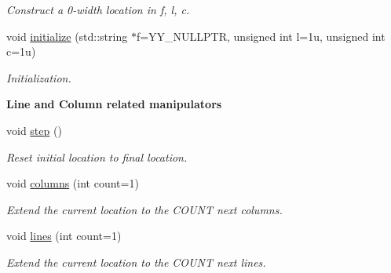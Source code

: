 \begin{DoxyCompactItemize}
\begin{DoxyCompactList}\small\item\em Construct a 0-\/width location in {\itshape f}, {\itshape l}, {\itshape c}. \end{DoxyCompactList}\item 
void \hyperlink{classEquationParser_1_1location_a5c7d7aa2ae28c40f506e83514acb3947}{initialize} (std\+::string $\ast$f=Y\+Y\+\_\+\+N\+U\+L\+L\+P\+TR, unsigned int l=1u, unsigned int c=1u)\hypertarget{classEquationParser_1_1location_a5c7d7aa2ae28c40f506e83514acb3947}{}\label{classEquationParser_1_1location_a5c7d7aa2ae28c40f506e83514acb3947}

\begin{DoxyCompactList}\small\item\em Initialization. \end{DoxyCompactList}\end{DoxyCompactItemize}
\begin{Indent}{\bf Line and Column related manipulators}\par
\begin{DoxyCompactItemize}
\item 
void \hyperlink{classEquationParser_1_1location_a8796256e64c782808b9e6cc5076f7b6b}{step} ()\hypertarget{classEquationParser_1_1location_a8796256e64c782808b9e6cc5076f7b6b}{}\label{classEquationParser_1_1location_a8796256e64c782808b9e6cc5076f7b6b}

\begin{DoxyCompactList}\small\item\em Reset initial location to final location. \end{DoxyCompactList}\item 
void \hyperlink{classEquationParser_1_1location_aef9d17fbbfb8a0a98cd0bf3356008a72}{columns} (int count=1)\hypertarget{classEquationParser_1_1location_aef9d17fbbfb8a0a98cd0bf3356008a72}{}\label{classEquationParser_1_1location_aef9d17fbbfb8a0a98cd0bf3356008a72}

\begin{DoxyCompactList}\small\item\em Extend the current location to the C\+O\+U\+NT next columns. \end{DoxyCompactList}\item 
void \hyperlink{classEquationParser_1_1location_a856b91626aa857984a450e4395a4f41c}{lines} (int count=1)\hypertarget{classEquationParser_1_1location_a856b91626aa857984a450e4395a4f41c}{}\label{classEquationParser_1_1location_a856b91626aa857984a450e4395a4f41c}

\begin{DoxyCompactList}\small\item\em Extend the current location to the C\+O\+U\+NT next lines. \end{DoxyCompactList}\end{DoxyCompactItemize}
\end{Indent}
